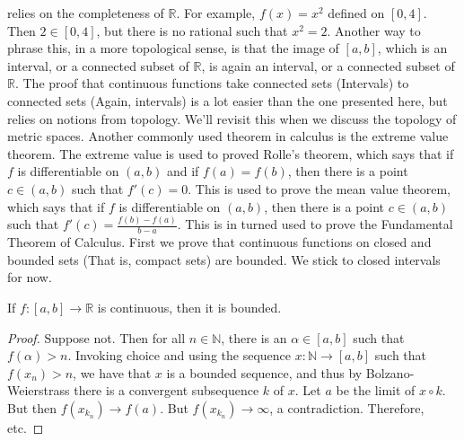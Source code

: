             relies on the completeness of $\mathbb{R}$. For
            example, $f(x)=x^{2}$ defined on $[0,4]$.
            Then $2\in[0,4]$, but there is no
            rational such that $x^{2}=2$.
            Another way to phrase this, in a more topological
            sense, is that the image of $[a,b]$, which is an
            interval, or a connected subset of $\mathbb{R}$,
            is again an interval, or a connected subset of
            $\mathbb{R}$. The proof that continuous
            functions take connected sets (Intervals)
            to connected sets (Again, intervals) is a lot
            easier than the one presented
            here, but relies on notions from topology.
            We'll revisit this when we
            discuss the topology of metric spaces.
            Another commonly used theorem in calculus
            is the extreme value theorem.
            The extreme value is used to proved Rolle's theorem,
            which says that if $f$ is differentiable on $(a,b)$
            and if $f(a)=f(b)$, then there is a point
            $c\in(a,b)$ such that $f'(c)=0$. This is used to
            prove the mean value theorem, which says that
            if $f$ is differentiable on $(a,b)$,
            then there is a point $c\in(a,b)$ such that
            $f'(c)=\frac{f(b)-f(a)}{b-a}$. This is in
            turned used to prove the Fundamental Theorem
            of Calculus. First we prove that continuous functions
            on closed and bounded sets (That is,
            compact sets) are bounded. We stick to
            closed intervals for now.
            \begin{theorem}
                If $f:[a,b]\rightarrow\mathbb{R}$ is
                continuous, then it is bounded.
            \end{theorem}
            \begin{proof}
                Suppose not. Then for all $n\in\mathbb{N}$, 
                there is an $\alpha\in[a,b]$ such that
                $f(\alpha)>n$. Invoking choice and using the
                sequence $x:\mathbb{N}\rightarrow[a,b]$ such
                that $f(x_{n})>n$, we have that
                $x$ is a bounded sequence, and thus by
                Bolzano-Weierstrass there is a convergent
                subsequence $k$ of $x$. Let $a$ be the limit of
                $x\circ{k}$.
                But then $f(x_{k_{n}})\rightarrow{f(a)}$.
                But $f(x_{k_{n}})\rightarrow\infty$,
                a contradiction. Therefore, etc.
            \end{proof}
